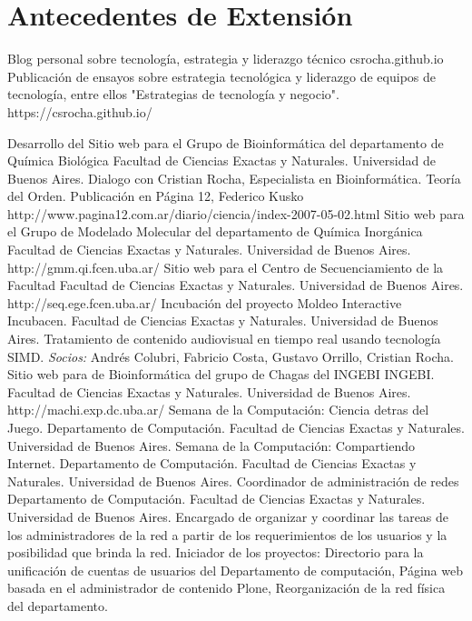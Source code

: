 \section{Antecedentes de Extensión}

	{Blog personal sobre tecnología, estrategia y liderazgo técnico}
	{csrocha.github.io}
	{}
	{}
	{Publicación de ensayos sobre estrategia tecnológica y liderazgo de equipos de tecnología, entre ellos "Estrategias de tecnología y negocio". https://csrocha.github.io/}

	{Desarrollo del Sitio web para el Grupo de Bioinformática del departamento de Química Biológica}
	{Facultad de Ciencias Exactas y Naturales. Universidad de Buenos Aires. }
	{}
	{}
	{}
	{Dialogo con Cristian Rocha, Especialista en Bioinformática. Teoría del Orden.}
	{Publicación en Página 12, Federico Kusko}
	{}
	{}
	{http://www.pagina12.com.ar/diario/ciencia/index-2007-05-02.html}
	{Sitio web para el Grupo de Modelado Molecular del departamento de Química Inorgánica}
	{Facultad de Ciencias Exactas y Naturales. Universidad de Buenos Aires.}
	{}
	{}
	{http://gmm.qi.fcen.uba.ar/}
	{Sitio web para el Centro de Secuenciamiento de la Facultad}
	{Facultad de Ciencias Exactas y Naturales. Universidad de Buenos Aires.}
	{}
	{}
	{http://seq.ege.fcen.uba.ar/}
	{Incubación del proyecto Moldeo Interactive}
	{Incubacen. Facultad de Ciencias Exactas y Naturales. Universidad de Buenos Aires.}
	{}
	{}
	{Tratamiento de contenido audiovisual en tiempo real usando tecnología SIMD. \emph{Socios:} Andrés Colubri, Fabricio Costa, Gustavo Orrillo, Cristian Rocha.}
	{Sitio web para de Bioinformática del grupo de Chagas del INGEBI}
	{INGEBI. Facultad de Ciencias Exactas y Naturales. Universidad de Buenos Aires. }
	{}
	{}
	{http://machi.exp.dc.uba.ar/}
	{Semana de la Computación: Ciencia detras del Juego.}
	{Departamento de Computación. Facultad de Ciencias Exactas y Naturales. Universidad de Buenos Aires.}
	{}
	{}
	{}
	{Semana de la Computación: Compartiendo Internet.}
	{Departamento de Computación. Facultad de Ciencias Exactas y Naturales. Universidad de Buenos Aires.}
	{}
	{}
	{}
	{Coordinador de administración de redes}
	{Departamento de Computación. Facultad de Ciencias Exactas y Naturales. Universidad de Buenos Aires.}
	{}
	{}
	{Encargado de organizar y coordinar las tareas de los
 	administradores de la red a partir de los requerimientos de los usuarios y
 	la posibilidad que brinda la red. Iniciador de los proyectos: Directorio
 	para la unificación de cuentas de usuarios del Departamento de computación,
 	Página web basada en el administrador de contenido Plone, Reorganización
	de la red física del departamento.}


